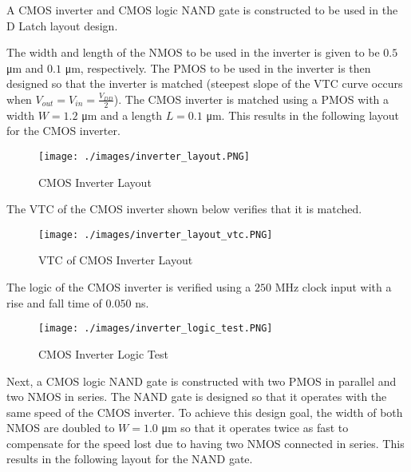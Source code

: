 
A CMOS inverter and CMOS logic NAND gate is constructed to be used in the D Latch layout design.

The width and length of the NMOS to be used in the inverter is given to be $0.5$ \si{\micro\meter} and $0.1$ \si{\micro\meter}, respectively.
The PMOS to be used in the inverter is then designed so that the inverter is matched (steepest slope of the VTC curve occurs when $V_{out} = V_{in} = \frac{V_{DD}}{2}$).
The CMOS inverter is matched using a PMOS with a width $W = 1.2$ \si{\micro\meter} and a length $L = 0.1$ \si{\micro\meter}.
This results in the following layout for the CMOS inverter.

\FloatBarrier

\begin{figure}[h!]
	\centering
	\texttt{[image: ./images/inverter\_layout.PNG]}
	\caption{CMOS Inverter Layout}
	\label{fig:inverter_layout}
\end{figure}

\FloatBarrier

The VTC of the CMOS inverter shown below verifies that it is matched.

\FloatBarrier

\begin{figure}[h!]
	\centering
	\texttt{[image: ./images/inverter\_layout\_vtc.PNG]}
	\caption{VTC of CMOS Inverter Layout}
	\label{fig:inverter_layout_vtc}
\end{figure}

\FloatBarrier

The logic of the CMOS inverter is verified using a $250$ \si{\mega\hertz} clock input with a rise and fall time of $0.050$ \si{\nano\second}.

\FloatBarrier

\begin{figure}[h!]
	\centering
	\texttt{[image: ./images/inverter\_logic\_test.PNG]}
	\caption{CMOS Inverter Logic Test}
	\label{fig:inverter_layout_logic}
\end{figure}

\FloatBarrier

Next, a CMOS logic NAND gate is constructed with two PMOS in parallel and two NMOS in series.
The NAND gate is designed so that it operates with the same speed of the CMOS inverter.
To achieve this design goal, the width of both NMOS are doubled to $W = 1.0$ \si{\micro\meter} so that it operates twice as fast to compensate for the speed lost due to having two NMOS connected in series.
This results in the following layout for the NAND gate.

